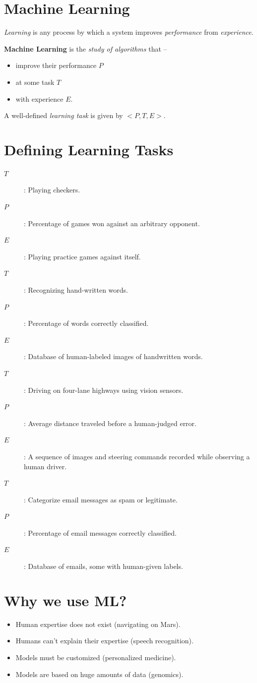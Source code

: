 \documentclass[
	number={1},
	title={Machine Learning Fundamentals}
]{cs584notes}
\begin{document}
\newcommand{\learningtask}[3]{%
	\begin{description}
	\item[$T$]: #1
	\item[$P$]: #2
	\item[$E$]: #3
	\end{description}
	\vspace*{0.25em}
}

\section{Machine Learning}\label{sec:machine-learning}
\begin{displayquote}
	\emph{Learning} is any process by which a system improves \emph{performance} from \emph{experience}.
\end{displayquote}

\textbf{Machine Learning} is the \emph{study of algorithms} that --
\begin{itemize}
	\item improve their performance \emph{$P$}
	\item at some task \emph{$T$}
	\item with experience \emph{$E$}.
\end{itemize}
A well-defined \emph{learning task} is given by $<P,T,E>$.

\section{Defining Learning Tasks}\label{sec:defining-learning-tasks}
\learningtask{Playing checkers.}{Percentage of games won against an arbitrary opponent.}{Playing practice games against itself.}

\learningtask{Recognizing hand-written words.}{Percentage of words correctly classified.}{Database of human-labeled images of handwritten words.}

\learningtask{Driving on four-lane highways using vision sensors.}{Average distance traveled before a human-judged error.}{A sequence of images and steering commands recorded while observing a human driver.}

\learningtask{Categorize email messages as spam or legitimate.}{Percentage of email messages correctly classified.}{Database of emails, some with human-given labels.}

\section{Why we use ML?}\label{sec:why-we-use-ml?}
\begin{itemize}
	\item Human expertise does not exist (navigating on Mars).
	\item Humans can't explain their expertise (speech recognition).
	\item Models must be customized (personalized medicine).
	\item Models are based on huge amounts of data (genomics).
\end{itemize}
\end{document}
